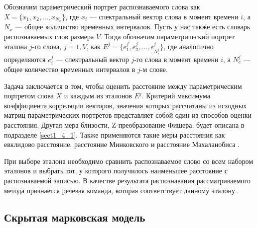 Обозначим параметрический портрет распознаваемого слова как $X = \{x_1, x_2, \dots, x_{N_x} \}$, где $x_i$ --- спектральный вектор слова в момент времени $i$, а $N_x$ --- общее количество временных интервалов.
Пусть у нас также есть словарь распознаваемых слов размера $V$.
Тогда обозначим параметрический портрет эталона $j$-го слова, $j = \overline{1, V}$, как $E^j = \{e_1^j, e_2^j, \dots, e_{N_e^j}^j \}$, где аналогично определяются $e_i^j$ --- спектральный вектор $j$-го слова в момент времени $i$, а $N_e^j$ --- общее количество временных интервалов в $j$-м слове.

Задача заключается в том, чтобы оценить расстояние между параметрическим портретом слова $X$ и каждым из эталонов $E^j$.
Критерий максимума коэффициента корреляции векторов, значения которых рассчитаны из исходных матриц параметрических портретов представляет собой один из способов оценки расстояния.
Другая мера близости, Z-преобразование Фишера, будет описана в подразделе \ref{sect1_4_1}.
Также применяются такие меры расстояния как евклидово расстояние, расстояние Минковского и расстояние Махаланобиса \cite{mahalanobis1936generalized}.

При выборе эталона необходимо сравнить распознаваемое слово со всем набором эталонов и выбрать тот, у которого получилось наименьшее расстояние с распознаваемой записью.
В качестве результата распознавания рассматриваемого метода признается речевая команда, которая соответствует данному эталону.


\subsection{Скрытая марковская модель} \label{sect1_3_2}


